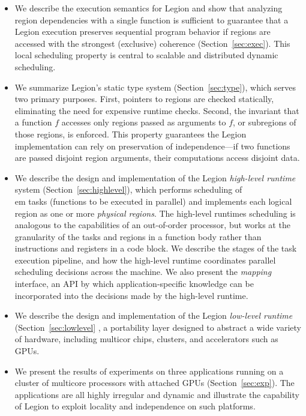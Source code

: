 \documentclass[9pt,nocopyrightspace]{sigplanconf}
\begin{document}
\begin{itemize}

\item We describe the execution semantics for Legion and show that 
analyzing region dependencies with a single function is sufficient to 
guarantee that a Legion execution preserves sequential program
behavior if regions are accessed with the strongest (exclusive)
coherence (Section~\ref{sec:exec}).  This local scheduling property is central to 
scalable and distributed dynamic scheduling.

\item We summarize Legion's static type system (Section~\ref{sec:type}), which serves two primary
  purposes.  First, pointers to regions are checked
  statically, eliminating the need for expensive runtime checks.
  Second, the invariant that a function $f$ accesses only
  regions passed as arguments to $f$, or subregions of those regions, is enforced.
  This property guarantees the Legion implementation can rely on
  preservation of independence---if two functions are passed disjoint
  region arguments, their computations access disjoint
data.  

\item We describe the design and implementation of the Legion {\em high-level runtime}
system (Section~\ref{sec:highlevel}), which performs scheduling of {\\em tasks} (functions to be executed in parallel)
and implements each logical region as one or more {\em physical regions}.
The high-level runtimes scheduling is analogous to the capabilities of an out-of-order processor,
but works at the granularity of the tasks and regions in a function body rather than instructions and registers
in a code block.  We describe the stages of the task execution pipeline, and how the high-level runtime coordinates parallel
scheduling decisions across the machine.  We also present the {\em mapping} interface, an API by which
application-specific knowledge can be incorporated into the decisions made by the high-level runtime.

\item We describe the design and implementation of the Legion {\em low-level runtime} (Section~\ref{sec:lowlevel} ,
a portability layer designed to abstract a wide variety of hardware, including multicor chips, clusters, and accelerators
such as GPUs.

\item We present the results of experiments on three applications running on a cluster of multicore processors with
attached GPUs (Section~\ref{sec:exp}).  The applications are all highly irregular and dynamic and illustrate the capability of Legion to 
exploit locality and independence on such platforms.

\end{itemize}















{
\small

}
\end{document}
